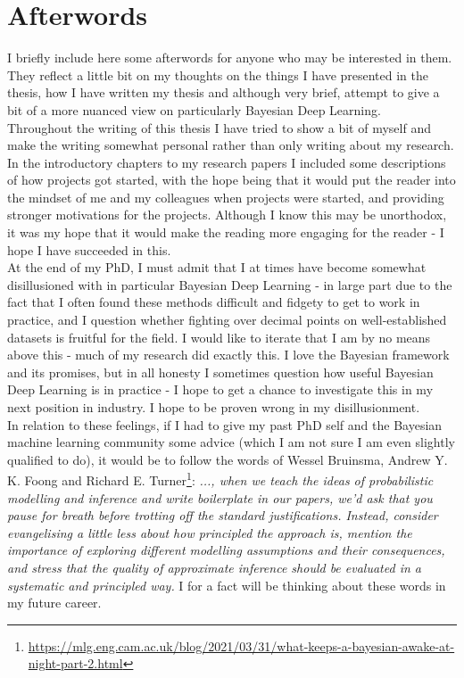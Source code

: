 \chapter{Afterwords}

I briefly include here some afterwords for anyone who may be interested in them. They reflect a little bit on my thoughts on the things I have presented in the thesis, how I have written my thesis and although very brief, attempt to give a bit of a more nuanced view on particularly Bayesian Deep Learning.\\

\noindent Throughout the writing of this thesis I have tried to show a bit of myself and make the writing somewhat personal rather than only writing about my research. In the introductory chapters to my research papers I included some descriptions of how projects got started, with the hope being that it would put the reader into the mindset of me and my colleagues when projects were started, and providing stronger motivations for the projects. Although I know this may be unorthodox, it was my hope that it would make the reading more engaging for the reader - I hope I have succeeded in this. \\

\noindent At the end of my PhD, I must admit that I at times have become somewhat disillusioned with in particular Bayesian Deep Learning - in large part due to the fact that I often found these methods difficult and fidgety to get to work in practice, and I question whether fighting over decimal points on well-established datasets is fruitful for the field. I would like to iterate that I am by no means above this - much of my research did exactly this. I love the Bayesian framework and its promises, but in all honesty I sometimes question how useful Bayesian Deep Learning is in practice - I hope to get a chance to investigate this in my next position in industry. I hope to be proven wrong in my disillusionment. \\

\noindent In relation to these feelings, if I had to give my past PhD self and the Bayesian machine learning community some advice (which I am not sure I am even slightly qualified to do), it would be to follow the words of Wessel Bruinsma, Andrew Y. K. Foong and Richard E. Turner\footnote{\url{https://mlg.eng.cam.ac.uk/blog/2021/03/31/what-keeps-a-bayesian-awake-at-night-part-2.html}}: \textit{..., when we teach the ideas of probabilistic modelling and inference and write boilerplate in our papers, we’d ask that you pause for breath before trotting off the standard justifications. Instead, consider evangelising a little less about how principled the approach is, mention the importance of exploring different modelling assumptions and their consequences, and stress that the quality of approximate inference should be evaluated in a systematic and principled way.} I for a fact will be thinking about these words in my future career.

